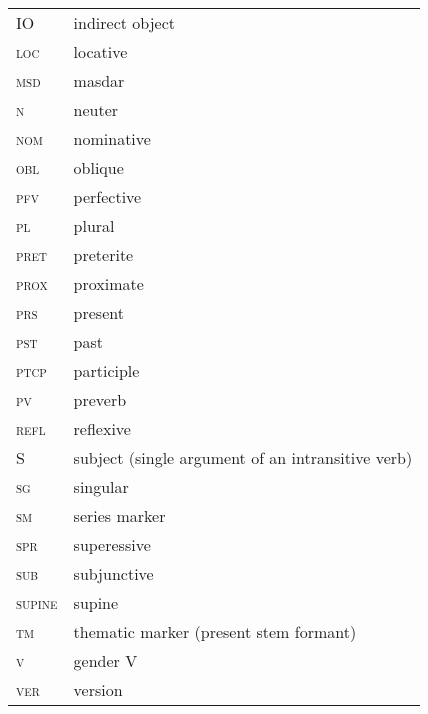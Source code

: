 \documentclass[output=paper,colorlinks,citecolor=brown,draftmode]{langscibook}
\begin{document}
\begin{tabularx}{.45\textwidth}{@{}lQ@{}}
IO & indirect object \\
\textsc{loc} & {locative}\\
\textsc{msd} & masdar \\
\textsc{n} & neuter \\
\textsc{nom} & nominative \\
\textsc{obl} & {oblique} \\
\textsc{pfv} & perfective \\
\textsc{pl} & plural \\
\textsc{pret} & preterite \\
\textsc{prox} & proximate \\
\textsc{prs} & present \\
\textsc{pst} & past \\
\textsc{ptcp} & participle \\
\textsc{pv} & preverb \\
\textsc{refl} & reflexive \\
\textsc{S} & subject (single {argument} of an intransitive {verb}) \\
\textsc{sg} & singular \\
\textsc{sm} & series marker \\
\textsc{spr} & superessive \\
\textsc{sub} & subjunctive \\
\textsc{supine} & supine \\
\textsc{tm} & thematic marker (present stem formant) \\
\textsc{v} & gender V \\
\textsc{ver} & version \\
\end{tabularx}



\sloppy
\printbibliography[heading=subbibliography,notkeyword=this]
\end{document}
